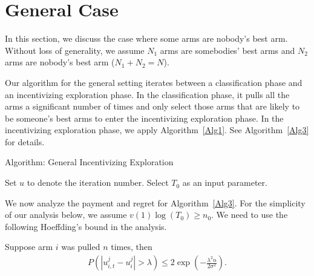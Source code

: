 \section*{General Case}

In this section, we discuss the case where some arms are nobody's best arm. Without loss of generality, we assume $N_1$ arms are somebodies' best arms and $N_2$ arms are nobody's best arm ($N_1+N_2=N$). 

Our algorithm for the general setting iterates between a classification phase and an incentivizing exploration phase. In the classification phase, it pulls all the arms a significant number of times and only select those arms that are likely to be someone's best arms to enter the incentivizing exploration phase. In the incentivizing exploration phase, we apply Algorithm~\ref{Alg1}. See Algorithm~\ref{Alg3} for details.

\begin{algorithm}
\caption{Algorithm: General Incentivizing Exploration}
\label{Alg3}
\begin{algorithmic}
\STATE Set $u$ to denote the iteration number. Select $T_0$ as an input parameter.
\ENDFOR

\end{algorithmic}
\end{algorithm}

We now analyze the payment and regret for Algorithm~\ref{Alg3}. For the simplicity of our analysis below, we assume $v(1)\log(T_0)\geq n_0$.  We need to use the following Hoeffding's bound in the analysis.

\begin{lemma}
Suppose arm $i$ was pulled $n$ times, then
\begin{align}
P(|u_{i,t}^{j}-u_{i}^{j}|>\lambda)\leq 2\exp\left(-\frac{\lambda^2 n}{2\sigma^2}\right). \nonumber 
\end{align}
\end{lemma}

